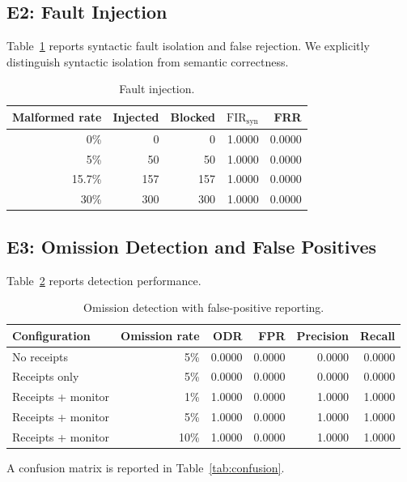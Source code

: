 \documentclass[journal]{IEEEtran}
\begin{document}
\subsection{E2: Fault Injection}
Table~\ref{tab:fault} reports syntactic fault isolation and false rejection. We explicitly distinguish syntactic isolation from semantic correctness.

\begin{table}[!t]
\centering
\caption{Fault injection.}
\label{tab:fault}
\small
\begin{tabular}{@{}r r r r r@{}}
\toprule
Malformed rate & Injected & Blocked & $\mathrm{FIR}_{\mathrm{syn}}$ & FRR \\
\midrule
0\% & 0 & 0 & 1.0000 & 0.0000 \\
5\% & 50 & 50 & 1.0000 & 0.0000 \\
15.7\% & 157 & 157 & 1.0000 & 0.0000 \\
30\% & 300 & 300 & 1.0000 & 0.0000 \\
\bottomrule
\end{tabular}
\end{table}

\subsection{E3: Omission Detection and False Positives}
Table~\ref{tab:omission} reports detection performance.

\begin{table}[!t]
\centering
\caption{Omission detection with false-positive reporting.}
\label{tab:omission}
\small
\begin{tabular}{@{}l r r r r r@{}}
\toprule
Configuration & Omission rate & ODR & FPR & Precision & Recall \\
\midrule
No receipts & 5\% & 0.0000 & 0.0000 & 0.0000 & 0.0000 \\
Receipts only & 5\% & 0.0000 & 0.0000 & 0.0000 & 0.0000 \\
Receipts + monitor & 1\% & 1.0000 & 0.0000 & 1.0000 & 1.0000 \\
Receipts + monitor & 5\% & 1.0000 & 0.0000 & 1.0000 & 1.0000 \\
Receipts + monitor & 10\% & 1.0000 & 0.0000 & 1.0000 & 1.0000 \\
\bottomrule
\end{tabular}
\end{table}

A confusion matrix is reported in Table~\ref{tab:confusion}.
\end{document}
